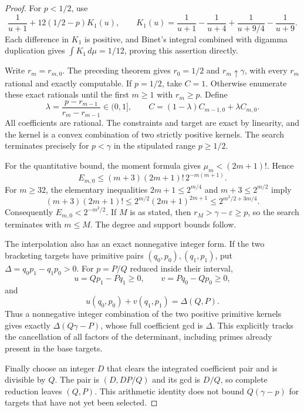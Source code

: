 \documentclass[11pt,a4paper]{article}
\theoremstyle{definition}
\theoremstyle{remark}
\begin{document}
\begin{proof}
For $p<1/2$, use
\[
 \frac1{u+1}+12(1/2-p)K_1(u),\qquad
 K_1(u)=\frac1{u+1}-\frac1{u+4}
       +\frac1{u+9/4}-\frac1{u+9}.
\]
Each difference in $K_1$ is positive, and Binet's integral combined with
digamma duplication \cite{dlmf-binet,dlmf-duplication}
gives $\int K_1\,d\mu=1/12$, proving this assertion directly.

Write $r_m=r_{m,0}$. The preceding theorem gives $r_0=1/2$ and
$r_m\uparrow\gamma$, with every $r_m$ rational and exactly computable.
If $p=1/2$, take $C=1$. Otherwise enumerate these exact rationals until
the first $m\ge1$ with $r_m\ge p$. Define
\[
 \lambda=\frac{p-r_{m-1}}{r_m-r_{m-1}}\in(0,1],\qquad
 C=(1-\lambda)C_{m-1,0}+\lambda C_{m,0}.
\]
All coefficients are rational. The constraints and target are exact by
linearity, and the kernel is a convex combination of two strictly
positive kernels. The search terminates precisely for $p<\gamma$ in
the stipulated range $p\ge1/2$.

For the quantitative bound, the moment formula gives
$\mu_m<(2m+1)!$. Hence
\[
 E_{m,0}\le(m+3)(2m+1)!\,2^{-m(m+1)}.
\]
For $m\ge32$, the elementary inequalities
$2m+1\le2^{m/4}$ and $m+3\le2^{m/2}$ imply
\[
 (m+3)(2m+1)!\le
 2^{m/2}(2m+1)^{2m+1}
 \le2^{m^2/2+3m/4}.
\]
Consequently $E_{m,0}<2^{-m^2/2}$.
If $M$ is as stated, then $r_M>\gamma-\varepsilon\ge p$, so the search
terminates with $m\le M$. The degree and support bounds follow.

The interpolation also has an exact nonnegative integer form. If the
two bracketing targets have primitive pairs $(q_0,p_0),(q_1,p_1)$,
put $\Delta=q_0p_1-q_1p_0>0$. For $p=P/Q$ reduced inside their interval,
\[
 u=Qp_1-Pq_1\ge0,\qquad v=Pq_0-Qp_0\ge0,
\]
and
\[
 u(q_0,p_0)+v(q_1,p_1)=\Delta(Q,P).
\]
Thus a nonnegative integer combination of the two positive primitive
kernels gives exactly $\Delta(Q\gamma-P)$, whose full coefficient gcd
is $\Delta$. This explicitly tracks the cancellation of all factors of
the determinant, including primes already present in the base targets.

Finally choose an integer $D$ that clears the integrated coefficient
pair and is divisible by $Q$. The pair is $(D,DP/Q)$ and its gcd is
$D/Q$, so complete reduction leaves $(Q,P)$. This arithmetic identity
does not bound $Q(\gamma-p)$ for targets that have not yet been selected.
\end{proof}


\end{document}
